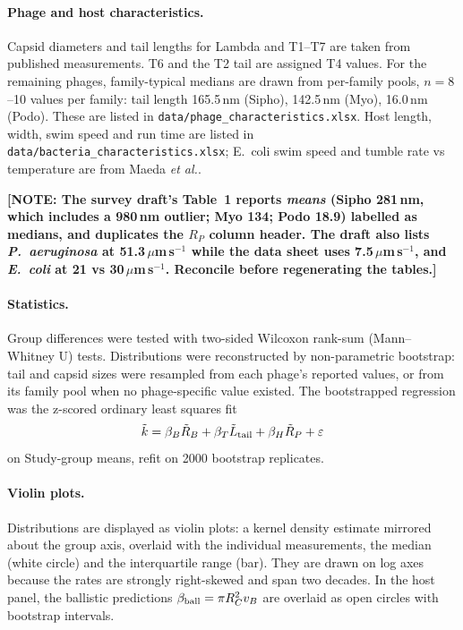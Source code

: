 \documentclass[12pt]{article}
\newcommand{\note}[1]{{\color{red}\textbf{[NOTE: #1]}}}
\begin{document}
\paragraph{Phage and host characteristics.} Capsid diameters and tail lengths for Lambda and T1--T7 are taken from published measurements. T6 and the T2 tail are assigned T4 values. For the remaining phages, family-typical medians are drawn from per-family pools, $n=8$--10 values per family: tail length 165.5\,nm (Sipho), 142.5\,nm (Myo), 16.0\,nm (Podo). These are listed in \texttt{data/phage\_characteristics.xlsx}. Host length, width, swim speed and run time are listed in \texttt{data/bacteria\_characteristics.xlsx}; E.~coli swim speed and tumble rate vs temperature are from Maeda \textit{et al.}\cite{maeda1976effect}.

\note{The survey draft's Table~1 reports \emph{means} (Sipho 281\,nm, which includes a 980\,nm outlier; Myo 134; Podo 18.9) labelled as medians, and duplicates the $R_P$ column header. The draft also lists \textit{P.~aeruginosa} at 51.3\,$\mu$m\,s$^{-1}$ while the data sheet uses 7.5\,$\mu$m\,s$^{-1}$, and \textit{E.~coli} at 21 vs 30\,$\mu$m\,s$^{-1}$. Reconcile before regenerating the tables.}

\paragraph{Statistics.} Group differences were tested with two-sided Wilcoxon rank-sum (Mann--Whitney U) tests\cite{mann1947test}. Distributions were reconstructed by non-parametric bootstrap\cite{efron1993bootstrap}: tail and capsid sizes were resampled from each phage's reported values, or from its family pool when no phage-specific value existed. The bootstrapped regression was the z-scored ordinary least squares fit
\begin{equation}
\tilde k=\beta_B\tilde R_B+\beta_T\tilde L_{\rm tail}+\beta_H\tilde R_P+\varepsilon
\end{equation}
on Study-group means, refit on 2000 bootstrap replicates.

\paragraph{Violin plots.} Distributions are displayed as violin plots: a kernel density estimate mirrored about the group axis, overlaid with the individual measurements, the median (white circle) and the interquartile range (bar)\cite{hintze1998violin}. They are drawn on log axes because the rates are strongly right-skewed and span two decades. In the host panel, the ballistic predictions $\beta_{\rm ball}=\pi R_C^2v_B$ are overlaid as open circles with bootstrap intervals.
\end{document}

